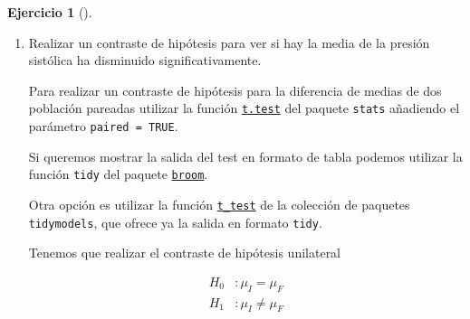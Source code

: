 \documentclass[
  a4paper,
]{scrreport}
\theoremstyle{definition}
\newtheorem{exercise}{Ejercicio}[chapter]
\theoremstyle{remark}
\begin{document}
\begin{exercise}[]
\begin{enumerate}
\begin{tcolorbox}
  \end{tcolorbox}
\item
  Realizar un contraste de hipótesis para ver si hay la media de la
  presión sistólica ha disminuido significativamente.

  \begin{tcolorbox}[enhanced jigsaw, breakable, toptitle=1mm, colbacktitle=quarto-callout-note-color!10!white, rightrule=.15mm, opacityback=0, opacitybacktitle=0.6, titlerule=0mm, coltitle=black, colframe=quarto-callout-note-color-frame, colback=white, bottomtitle=1mm, leftrule=.75mm, toprule=.15mm, title=\textcolor{quarto-callout-note-color}{\faInfo}\hspace{0.5em}{Ayuda}, arc=.35mm, bottomrule=.15mm, left=2mm]

  Para realizar un contraste de hipótesis para la diferencia de medias
  de dos población pareadas utilizar la función
  \href{https://www.rdocumentation.org/packages/stats/versions/3.6.2/topics/t.test}{\texttt{t.test}}
  del paquete \texttt{stats} añadiendo el parámetro
  \texttt{paired\ =\ TRUE}.

  Si queremos mostrar la salida del test en formato de tabla podemos
  utilizar la función \texttt{tidy} del paquete
  \href{https://broom.tidymodels.org/index.html}{\texttt{broom}}.

  Otra opción es utilizar la función
  \href{https://infer.tidymodels.org/reference/t_test.html}{\texttt{t\_test}}
  de la colección de paquetes \texttt{tidymodels}, que ofrece ya la
  salida en formato \texttt{tidy}.

  \end{tcolorbox}

  \begin{tcolorbox}[enhanced jigsaw, breakable, toptitle=1mm, colbacktitle=quarto-callout-tip-color!10!white, rightrule=.15mm, opacityback=0, opacitybacktitle=0.6, titlerule=0mm, coltitle=black, colframe=quarto-callout-tip-color-frame, colback=white, bottomtitle=1mm, leftrule=.75mm, toprule=.15mm, title=\textcolor{quarto-callout-tip-color}{\faLightbulb}\hspace{0.5em}{Solución}, arc=.35mm, bottomrule=.15mm, left=2mm]

  Tenemos que realizar el contraste de hipótesis unilateral

  \begin{align*}
  H_0 &: \mu_I = \mu_F \\
  H_1 &: \mu_I \neq \mu_F 
  \end{align*}


\end{tcolorbox}
\end{enumerate}
\end{exercise}
\end{document}
